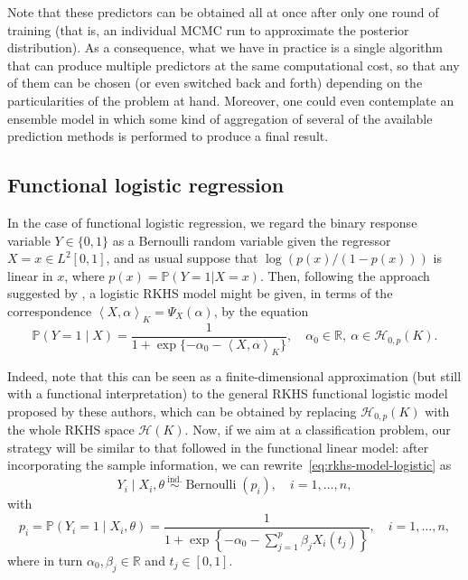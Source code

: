 \documentclass{article}
\numberwithin{equation}{section}
\theoremstyle{plain}
\newcommand{\R}{\mathbb{R}}
\newcommand{\Hcal}{\mathcal{H}}
\newcommand\dotprod[2]{\left\langle#1,#2\right\rangle}
\begin{document}
Note that these predictors can be obtained all at once after only one round of training (that is, an individual MCMC run to approximate the posterior distribution). As a consequence, what we have in practice is a single algorithm that can produce multiple predictors at the same computational cost, so that any of them can be chosen (or even switched back and forth) depending on the particularities of the problem at hand. Moreover, one could even contemplate an ensemble model in which some kind of aggregation of several of the available prediction methods is performed to produce a final result.

\subsection{Functional logistic regression}\label{sec:rkhs-logistic-model}

In the case of functional logistic regression, we regard the binary response variable \(Y\in\{0, 1\}\) as a Bernoulli random variable given the regressor \(X=x \in L^2[0, 1]\), and as usual suppose that \(\log\left(p(x)/(1-p(x))\right)\) is linear in \(x\), where \(p(x)=\mathbb P(Y=1| X=x)\). Then, following the approach  suggested by \citet{berrendero2023functional}, a logistic RKHS model might be given, in terms of the correspondence \(\dotprod{X}{\alpha}_K = \Psi_X(\alpha)\), by the equation
\begin{equation}\label{eq:rkhs-model-logistic}
  \mathbb P(Y=1 \mid X) = \frac{1}{1 + \exp\{-\alpha_0 - \dotprod{X}{\alpha}_K\}}, \quad \alpha_0 \in \R, \ \alpha \in \Hcal_{0,p}(K).
\end{equation}

Indeed, note that this can be seen as a finite-dimensional approximation (but still with a functional interpretation) to the general RKHS functional logistic model proposed by these authors, which can be obtained by replacing \(\Hcal_{0,p}(K)\) with the whole RKHS space \(\Hcal(K)\). Now, if we aim at a classification problem, our strategy will be similar to that followed in the functional linear model: after incorporating the sample information, we can rewrite~\eqref{eq:rkhs-model-logistic} as
\begin{equation}\label{eq:rkhs-model-logistic-2}
  Y_i \mid X_i,\theta \ \stackrel{\text{ind.}}{\sim} \operatorname{Bernoulli}(p_i), \quad i=1,\dots, n,
\end{equation}
with
\begin{equation}\label{eq:rkhs-model-logistic-2-parameter}
  p_i = \mathbb P(Y_i=1 \mid X_i,\theta) = \frac{1}{\displaystyle 1 + \exp\left\{-\alpha_0 - \sum_{j=1}^p \beta_j X_i(t_j)\right\}}, \quad i=1,\dots, n,
\end{equation}
where in turn \(\alpha_0,\beta_j\in\R\) and \(t_j\in[0, 1]\).
\end{document}
